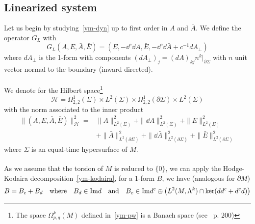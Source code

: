 \subsection{Linearized system}
Let us begin by studying~\cref{ym-dyn} up to first order in $A$ and $\bar{A}$. 
We define the operator $G_L$ with
\begin{equation}
G_L (A, E, \bar{A}, \bar{E}) = (E, -\dd^c \dd A, \bar{E}, -\dd^c \dd \bar{A} + c^{-1} dA_\bot)
\end{equation}
where $dA_\bot$ is the 1-form with components $(dA_\bot)_j = (dA)_{kj}n^k\vert_{\partial \Sigma}$ with $n$ unit vector normal to the boundary (inward directed). \\\\
%
%
We denote for the Hilbert space\footnote{
The space $\Omega^k_{p,q}(M)$ defined in~\cref{ym-pw} is a Banach space (see~\cite{Mazya2009} p. 200)
}
\begin{equation*}
\mathcal{H} = \Omega^{1}_{2,2}(\Sigma)\times L^2(\Sigma) \times \Omega^{1}_{2,2}(\partial \Sigma) \times L^2(\Sigma) 
\end{equation*}
with the norm associated to the inner product
\begin{equation}\label{ym-norm1}
\begin{split}
\| (A,E,\bar{A},\bar{E}) \|^2_{\mathcal{H}} = &
\| A\|^2_{L^2(\Sigma)} + \|\dd A\|^2_{L^2(\Sigma)}  + \| E \|^2_{L^2(\Sigma)} \\ & +
\| \bar{A}\|^2_{L^2(\partial \Sigma)} + \|\dd \bar{A}\|^2_{L^2(\partial \Sigma)}  + \| \bar{E} \|^2_{L^2(\partial \Sigma)}
\end{split}
\end{equation}
where $\Sigma$ is an equal-time hypersurface of $M$. 
\\\\
%
As we assume that the torsion of $M$ is reduced to $\{0\}$, we can apply the Hodge-Kodaira decomposition~\cref{ym-kodaira}, \ie for a 1-form $B$, we have (analogous for $\partial M$)
\begin{equation*}
B = B_c + B_d
\quad\textrm{where}\quad
B_d\in\mathrm{Im} d
\quad\textrm{and}\quad
B_c\in\mathrm{Im} d^c\oplus\big(L^2(M,\Lambda^k)\cap\ker(d d^c+d^c d)\big)
\end{equation*}
